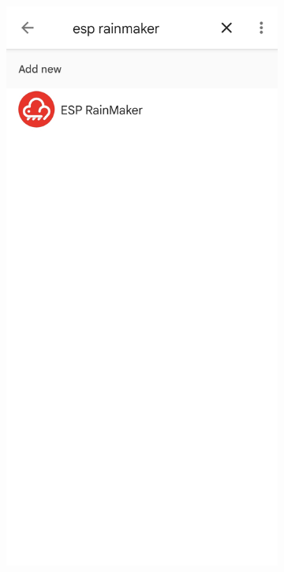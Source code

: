 \documentclass[a4paper,12pt,openany]{book}
\begin{document}
\begin{figure}[h!]
    \Centering
    \begin{subfigure}{0.4\textwidth}
        \RaggedLeft
        \includegraphics[height=1.3\textwidth,frame]{D9Z/9-15a} 
    \end{subfigure}\hspace{1em}
    \begin{subfigure}{0.4\textwidth}
        \RaggedRight

\end{subfigure}
\end{figure}
\end{document}
